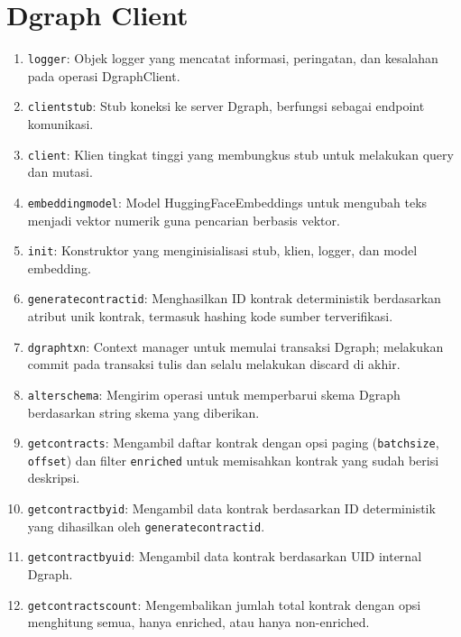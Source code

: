 \chapter{Dgraph Client}
\label{appendix:dgraph-client}

\begin{enumerate}
    \item \texttt{logger}: Objek logger yang mencatat informasi, peringatan, dan kesalahan pada operasi DgraphClient.
    \item \texttt{client\textunderscore stub}: Stub koneksi ke server Dgraph, berfungsi sebagai endpoint komunikasi.
    \item \texttt{client}: Klien tingkat tinggi yang membungkus stub untuk melakukan query dan mutasi.
    \item \texttt{embedding\textunderscore model}: Model HuggingFaceEmbeddings untuk mengubah teks menjadi vektor numerik guna pencarian berbasis vektor.
    \item \texttt{\textunderscore init\textunderscore }: Konstruktor yang menginisialisasi stub, klien, logger, dan model embedding.
    \item \texttt{generate\textunderscore contract\textunderscore id}: Menghasilkan ID kontrak deterministik berdasarkan atribut unik kontrak, termasuk hashing kode sumber terverifikasi.
    \item \texttt{dgraph\textunderscore txn}: Context manager untuk memulai transaksi Dgraph; melakukan commit pada transaksi tulis dan selalu melakukan discard di akhir.
    \item \texttt{alter\textunderscore schema}: Mengirim operasi untuk memperbarui skema Dgraph berdasarkan string skema yang diberikan.
    \item \texttt{get\textunderscore contracts}: Mengambil daftar kontrak dengan opsi paging (\texttt{batch\textunderscore size}, \texttt{offset}) dan filter \texttt{enriched} untuk memisahkan kontrak yang sudah berisi deskripsi.
    \item \texttt{get\textunderscore contract\textunderscore by\textunderscore id}: Mengambil data kontrak berdasarkan ID deterministik yang dihasilkan oleh \texttt{generate\textunderscore contract\textunderscore id}.
    \item \texttt{get\textunderscore contract\textunderscore by\textunderscore uid}: Mengambil data kontrak berdasarkan UID internal Dgraph.
    \item \texttt{get\textunderscore contracts\textunderscore count}: Mengembalikan jumlah total kontrak dengan opsi menghitung semua, hanya enriched, atau hanya non-enriched.

\end{enumerate}
